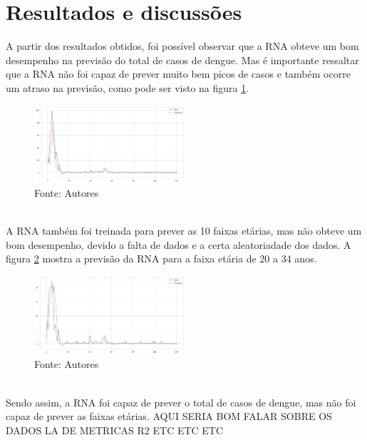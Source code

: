 \documentclass[
	article,			%
	12pt,				%
	a4paper,			%
	chapter=TITLE,		%
	section=TITLE,		%
	subsection=TITLE,	%
	subsubsection=TITLE %
	english,			%
	brazil,				%
	sumario=tradicional
	]{abntex2}
\begin{document}
\section{Resultados e discussões}
A partir dos resultados obtidos, foi possível observar que a RNA obteve um bom desempenho na previsão do total de casos de dengue. Mas é importante ressaltar que a RNA não foi capaz de prever muito bem picos de casos e também ocorre um atraso na previsão, como pode ser visto na figura \ref{figure5}. 
\begin{figure}[htbp]
	\centering
	\includegraphics[width=0.5\textwidth]{imagens/imgCodigos/previsaoYtesteCasosTotais.png}
	\caption{Fonte: Autores}
	\label{figure5}
\end{figure}
\\ \indent
A RNA também foi treinada para prever as 10 faixas etárias, mas não obteve um bom desempenho, devido a falta de dados e a certa aleatoriadade dos dados. A figura \ref{figure6} mostra a previsão da RNA para a faixa etária de 20 a 34 anos.
\begin{figure}[htbp]
	\centering
	\includegraphics[width=0.5\textwidth]{imagens/imgCodigos/previsaoYteste2034.png}
	\caption{Fonte: Autores}
	\label{figure6}
\end{figure}
\\ \indent
Sendo assim, a RNA foi capaz de prever o total de casos de dengue, mas não foi capaz de prever as faixas etárias.
AQUI SERIA BOM FALAR SOBRE OS DADOS LA DE METRICAS R2 ETC ETC ETC
\\ \indent
\end{document}
